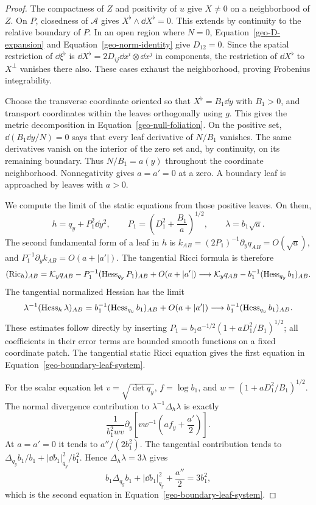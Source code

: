 \begin{proof}
The compactness of $Z$ and positivity of $u$ give $X\ne0$ on a neighborhood
of $Z$.  On $P$, closedness of $\mathcal A$ gives
$X^\flat\wedge\dd X^\flat=0$.  This extends by continuity to the relative
boundary of $P$.  In an open region where $N=0$, Equation~\eqref{geo-D-expansion}
and Equation~\eqref{geo-norm-identity} give $D_{12}=0$.  Since the spatial
restriction of $\dd\xi^\flat$ is $\dd X^\flat=2D_{ij}\dd x^i\otimes\dd x^j$
in components, the restriction of $\dd X^\flat$ to $X^\perp$ vanishes there
also.  These cases exhaust the neighborhood, proving Frobenius integrability.

Choose the transverse coordinate oriented so that $X^\flat=B_1\dd y$ with
$B_1>0$, and transport coordinates within the leaves orthogonally using $g$.
This gives the metric decomposition in Equation~\eqref{geo-null-foliation}.
On the positive set, $\dd(B_1\dd y/N)=0$ says that every leaf derivative of
$N/B_1$ vanishes.  The same derivatives vanish on the interior of the zero
set and, by continuity, on its remaining boundary.  Thus $N/B_1=a(y)$
throughout the coordinate neighborhood.  Nonnegativity gives $a=a'=0$ at
a zero.  A boundary leaf is approached by leaves with $a>0$.

We compute the limit of the static equations from those positive leaves.
On them,
\[
 h=q_y+P_1^2\dd y^2,\qquad
 P_1=\left(D_1^2+\frac{B_1}{a}\right)^{1/2},
 \qquad \lambda=b_1\sqrt a.
\]
The second fundamental form of a leaf in $h$ is
$k_{AB}=(2P_1)^{-1}\partial_yq_{AB}=O(\sqrt a)$, and
$P_1^{-1}\partial_yk_{AB}=O(a+|a'|)$.  The tangential Ricci formula is
therefore
\[
 (\operatorname{Ric}_h)_{AB}
  =\mathcal K_y q_{AB}-P_1^{-1}(\operatorname{Hess}_{q_y}P_1)_{AB}
        +O(a+|a'|)
  \longrightarrow
  \mathcal K_y q_{AB}-b_1^{-1}(\operatorname{Hess}_{q_y}b_1)_{AB}.
\]
The tangential normalized Hessian has the limit
\[
 \lambda^{-1}(\operatorname{Hess}_h\lambda)_{AB}
 =b_1^{-1}(\operatorname{Hess}_{q_y}b_1)_{AB}+O(a+|a'|)
 \longrightarrow b_1^{-1}(\operatorname{Hess}_{q_y}b_1)_{AB}.
\]
These estimates follow directly by inserting $P_1=b_1a^{-1/2}
(1+aD_1^2/B_1)^{1/2}$; all coefficients in their error terms are bounded
smooth functions on a fixed coordinate patch.  The tangential static
Ricci equation gives the first equation in
Equation~\eqref{geo-boundary-leaf-system}.

For the scalar equation let $v=\sqrt{\det q_y}$, $f=\log b_1$, and
$w=(1+aD_1^2/B_1)^{1/2}$.  The normal divergence contribution to
$\lambda^{-1}\Delta_h\lambda$ is exactly
\begin{equation}
 \frac1{b_1^2wv}\partial_y
       \left[vw^{-1}\left(af_y+\frac{a'}2\right)\right].
 \label{geo-normal-laplacian-limit}
\end{equation}
At $a=a'=0$ it tends to $a''/(2b_1^2)$.  The tangential contribution tends
to $\Delta_{q_y}b_1/b_1+|\dd b_1|_{q_y}^2/b_1^2$.  Hence
$\Delta_h\lambda=3\lambda$ gives
\[
 b_1\Delta_{q_y}b_1+|\dd b_1|_{q_y}^2+\frac{a''}2=3b_1^2,
\]
which is the second equation in Equation~\eqref{geo-boundary-leaf-system}.
\end{proof}

